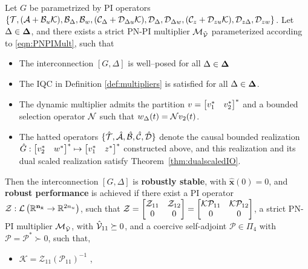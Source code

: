 \begin{theorem}\label{cor:robSYN}

	Let $G$ be parametrized by PI operators
	$\{\mathcal{T}, (\mathcal{A}+\mathcal{B}_u\mathcal{K}), \mathcal{B}_{\Delta}, \mathcal{B}_{w},
		(\mathcal{C}_\Delta + \mathcal{D}_{\Delta u}\mathcal{K}), \mathcal{D}_\Delta,
		\mathcal{D}_{\Delta w}, (\mathcal{C}_z+\mathcal{D}_{zu}\mathcal{K}),
		\mathcal{D}_{z\Delta}, \mathcal{D}_{zw}\}$. Let $\Delta\in\mathbf{\Delta}$, and
	there exists a {strict PN-PI} multiplier $\mathcal{M}_{\tilde{\mathcal{V}}}$ parameterized
	according to \eqref{eqn:PNPIMult}, such that

	\begin{itemize}
		\item The interconnection $[G,\Delta]$ is well--posed for all $\Delta\in\mathbf{\Delta}$
		\item The IQC in Definition \ref{def:multipliers} is satisfied for all $\Delta\in\mathbf{\Delta}$.
		\item The dynamic multiplier admits the partition
		\(v=\begin{bmatrix}v_1^*&v_2^*\end{bmatrix}^*\) and a bounded selection operator \(\mathcal{N}\)
		such that \(w_\Delta(t)=\mathcal{N} v_2(t)\).
		\item The hatted operators
		\(\{\hat{\mathcal{T}},\hat{\mathcal{A}},\hat{\mathcal{B}},\hat{\mathcal{C}},\hat{\mathcal{D}}\}\)
		denote the causal bounded realization
		\(\hat G:\begin{bmatrix}v_2^*&w^*\end{bmatrix}^*\mapsto\begin{bmatrix}v_1^*&z^*\end{bmatrix}^*\) constructed
		above, and this realization and its dual scaled realization satisfy Theorem~\ref{thm:dualscaledIO}.
	\end{itemize}
	Then the interconnection $[G,\Delta]$ is \textbf{robustly stable}, with
	$\hat{\mathbf{x}}(0) = 0$, and \textbf{robust performance} is achieved if
	there exist a PI operator
	$\mathcal{Z}: {\mathcal{L}\left( \mathbb{R}^{\mathbf{n}_{\hat{\mathbf{x}}}}
		\to \mathbb{R}^{2n_u} \right)}$, such that
	$\mathcal{Z} = \begin{bmatrix}\mathcal{Z}_{11} & \mathcal{Z}_{12} \\ 0 & 0\end{bmatrix}
		= \begin{bmatrix}\mathcal{K}\mathcal{P}_{11} & \mathcal{K}\mathcal{P}_{12} \\ 0 & 0\end{bmatrix}$,
	a strict PN-PI multiplier $\mathcal{M}_{\tilde{\mathcal{V}}}$, with
	$\hat{\mathcal{V}}_{11} \succeq 0$, and a coercive self-adjoint
	$\mathcal{P}\in \Pi_4$ with ${\mathcal{P}=\mathcal{P}^*\succ 0}$, such that,

	\begin{itemize}
		\item $\mathcal{K} = \mathcal{Z}_{11}\left(\mathcal{P}_{11}\right)^{-1}$ ,


\end{itemize}
\end{theorem}
